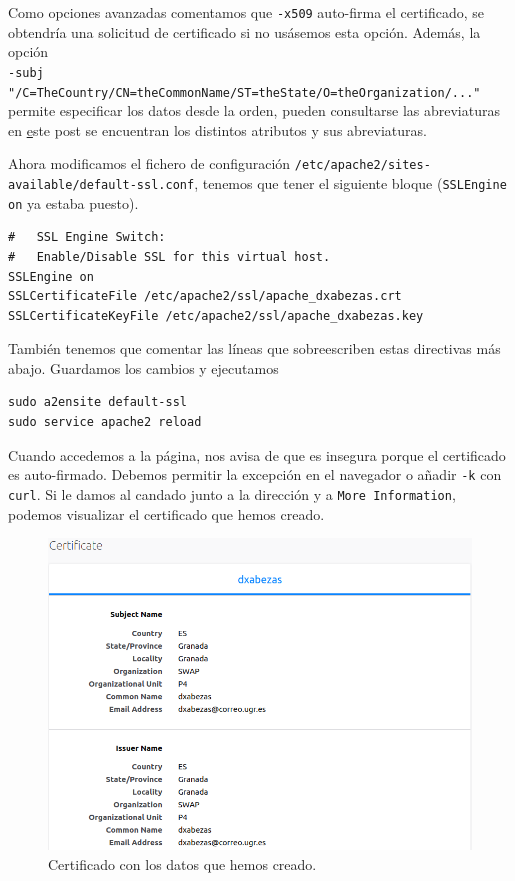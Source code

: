\documentclass{article}
\begin{document}
Como opciones avanzadas comentamos que \texttt{-x509} auto-firma el certificado, se obtendría una solicitud de certificado si no usásemos
esta opción. Además, la opción \\ \texttt{-subj "/C=TheCountry/CN=theCommonName/ST=theState/O=theOrganization/..."} permite especificar los datos
desde la orden, pueden consultarse las abreviaturas en \href{https://stackoverflow.com/questions/6464129/certificate-subject-x-509}
este post se encuentran los distintos atributos y sus abreviaturas.

Ahora modificamos el fichero de configuración \texttt{/etc/apache2/sites-available/default-ssl.conf}, tenemos que tener el siguiente
bloque (\verb|SSLEngine on| ya estaba puesto).

\begin{Verbatim}[tabsize=4]
#   SSL Engine Switch:
#   Enable/Disable SSL for this virtual host.
SSLEngine on
SSLCertificateFile /etc/apache2/ssl/apache_dxabezas.crt
SSLCertificateKeyFile /etc/apache2/ssl/apache_dxabezas.key
\end{Verbatim}
También tenemos que comentar las líneas que sobreescriben estas directivas más abajo. Guardamos los cambios y ejecutamos
\begin{Verbatim}[tabsize=4]
sudo a2ensite default-ssl
sudo service apache2 reload
\end{Verbatim}

Cuando accedemos a la página, nos avisa de que es insegura porque el certificado es auto-firmado. Debemos permitir la excepción en
el navegador o añadir \texttt{-k} con \texttt{curl}. Si le damos al candado junto a la dirección y a \texttt{More Information},
podemos visualizar el certificado que hemos creado.

\begin{figure}[H]
	\centering
	\includegraphics[width=140mm]{imgs/cert-view}
	\caption{Certificado con los datos que hemos creado.}
	\label{fig:cert-view}
\end{figure}
\end{document}
